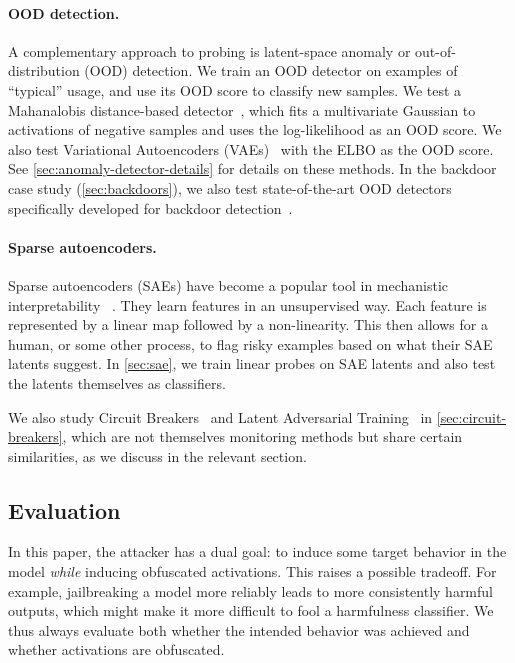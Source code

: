 \documentclass{article}
\begin{document}
\paragraph{OOD detection.}
A complementary approach to probing is latent-space anomaly or out-of-distribution (OOD) detection. We train an OOD detector on examples of   \enquote{typical} usage, and use its OOD score to classify new samples.
We test a Mahanalobis distance-based detector~\citep{mahalanobis1936on,podolskiy2021revisiting,chen2022expose}, which fits a multivariate Gaussian to activations of negative samples and uses the log-likelihood as an OOD score.
We also test Variational Autoencoders (VAEs)~\citep{kingma2013auto} with the ELBO as the OOD score. See \cref{sec:anomaly-detector-details} for details on these methods. 
In the backdoor case study (\cref{sec:backdoors}), we also test state-of-the-art OOD detectors specifically developed for backdoor detection~\citep{ma2024beatrix,mo2024robust}.

\paragraph{Sparse autoencoders.}
Sparse autoencoders (SAEs) have become a popular tool in mechanistic interpretability ~\citep{cunningham2023sparse, templeton2024scaling, gao2024scaling, lieberum2024gemma}. They learn features in an unsupervised way. Each feature is represented by a linear map followed by a non-linearity. 
This then allows for a human, or some other process, to flag risky examples based on what their SAE latents suggest.
In \cref{sec:sae}, we train linear probes on SAE latents and also test the latents themselves as classifiers.

We also study Circuit
Breakers~\citep{zou2024improving} and 
Latent Adversarial
Training~\citep{casper2024defending,sheshadri2024targeted}
in \cref{sec:circuit-breakers}, which are not
themselves monitoring methods but share certain
similarities, as we discuss in the relevant section.







\subsection{Evaluation}

In this paper, the attacker 
has a dual goal: to induce some target
behavior in the model \emph{while} inducing 
obfuscated activations. This raises 
a possible tradeoff.
For example, jailbreaking a model more reliably leads to more consistently harmful outputs, which might make it more difficult to fool a harmfulness classifier. We thus always evaluate both whether the intended behavior was achieved and whether activations are obfuscated.
\end{document}

